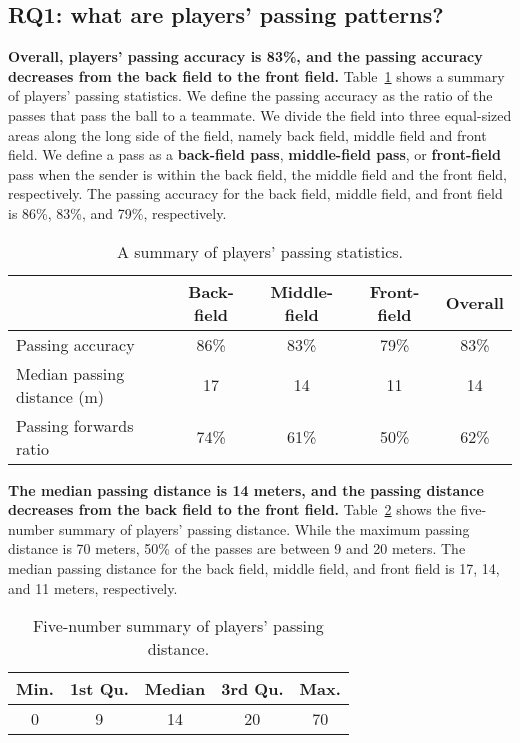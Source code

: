 \subsection{RQ1: what are players' passing patterns?}\label{RQ1-results}

\textbf{Overall, players' passing accuracy is 83\%, and the passing accuracy decreases from the back field to the front field.} 
Table~\ref{tab:pass-statistics} shows a summary of players' passing statistics. 
We define the passing accuracy as the ratio of the passes that pass the ball to a teammate.
We divide the field into three equal-sized areas along the long side of the field, namely back field, middle field and front field.
We define a pass as a \textbf{back-field pass}, \textbf{middle-field pass}, or \textbf{front-field} pass when the sender is within the back field, the middle field and the front field, respectively.
The passing accuracy for the back field, middle field, and front field is 86\%, 83\%, and 79\%, respectively.

\begin{table}[!t]
\caption{A summary of players' passing statistics.}
\centering
\begin{tabular}{lcccc}
  \hline
  & Back-field & Middle-field & Front-field & Overall \\
  \hline
  Passing accuracy & 86\% & 83\% & 79\% & 83\% \\
  Median passing distance (m) & 17 & 14 & 11 & 14 \\
  Passing forwards ratio & 74\% & 61\% & 50\% & 62\% \\
  \hline
\end{tabular}
\label{tab:pass-statistics}
\end{table}

\textbf{The median passing distance is 14 meters, and the passing distance decreases from the back field to the front field.}
Table~\ref{tab:pass-dist} shows the five-number summary of players' passing distance. While the maximum passing distance is 70 meters, 50\% of the passes are between 9 and 20 meters.
The median passing distance for the back field, middle field, and front field is 17, 14, and 11 meters, respectively.

\begin{table}[!t]
\caption{Five-number summary of players' passing distance.}
\centering
\begin{tabular}{c c c c c}
\hline
Min. & 1st Qu. & Median & 3rd Qu. & Max. \\
\hline
0 & 9 & 14 & 20 & 70 \\
\hline
\end{tabular}
\label{tab:pass-dist}
\end{table}

